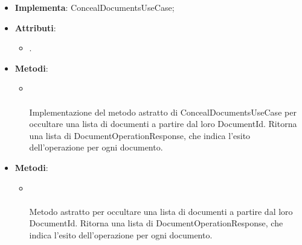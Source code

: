 \documentclass[10pt, a4paper]{article}
\begin{document}
\label{ConcealDocumentsServiceDettaglio}
\begin{itemize}
    \item \textbf{Implementa}: ConcealDocumentsUseCase;
    \item \textbf{Attributi}:
    \begin{itemize}
        \item {}.  
    \end{itemize}
    \item \textbf{Metodi}:
    \begin{itemize}
        \item {}\\ \\
        Implementazione del metodo astratto di ConcealDocumentsUseCase per occultare una lista di documenti a partire dal loro DocumentId. Ritorna una lista di DocumentOperationResponse, che indica l'esito dell'operazione per ogni documento.
    \end{itemize}
\end{itemize}

\label{ConcealDocumentsUseCaseDettaglio}
\begin{itemize}
    \item \textbf{Metodi}:
    \begin{itemize}
        \item {}\\ \\
        Metodo astratto per occultare una lista di documenti a partire dal loro DocumentId. Ritorna una lista di DocumentOperationResponse, che indica l'esito dell'operazione per ogni documento.
    \end{itemize}
\end{itemize}
\end{document}
